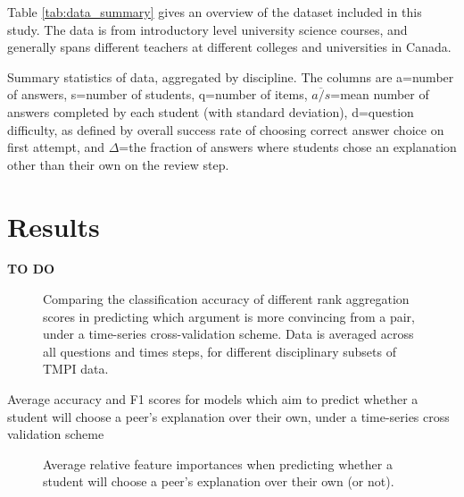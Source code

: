\documentclass[sigconf]{acmart}
\begin{document}
Table \ref{tab:data_summary} gives an overview of the dataset included in this 
study.
The data is from introductory level university science courses, and generally 
spans different teachers at different colleges and universities in Canada. 
 
\begin{table}
	
	\caption{
		Summary statistics of data, aggregated by discipline. 
		The columns are a=number of answers, s=number of students, q=number of 
		items, $\overline{a/s}$=mean number of answers completed by each 
		student (with standard deviation), d=question difficulty, as defined by 
		overall success rate of choosing correct answer choice on first 
		attempt, and $\Delta$=the fraction of answers where students chose an 
		explanation other than their own on the review step. 
	}
	\label{tab:data_summary}
\end{table}

\section{Results}
\textbf{TO DO}



\begin{figure}
	\scalebox{0.6}{}
	\caption{
		Comparing the classification accuracy of different rank aggregation 
		scores in predicting which argument is more convincing from a pair, 
		under a time-series cross-validation scheme. Data is averaged across 
		all questions and times steps, for different disciplinary subsets of 
		TMPI data. 
	}
	\label{fig:acc_by_rank_score_type}
\end{figure}


\begin{table}
	
	\caption{
		Average accuracy and F1 scores for models which aim to predict whether 
		a student will choose a peer's explanation over their own, under a 
		time-series cross validation scheme
	}
	\label{tab:switch_exp_acc}
\end{table}


\begin{figure}
	\scalebox{0.6}{}
	\caption{
		Average relative feature importances when predicting whether a student 
		will choose a peer's explanation over their own (or not).
	}
	\label{fig:switch_exp_feature_imp}
\end{figure}
\end{document}
